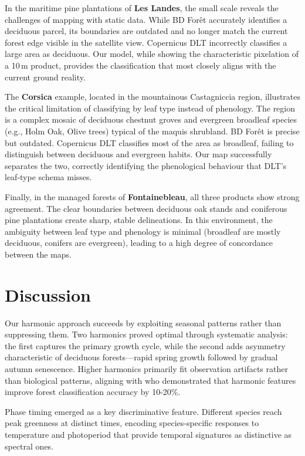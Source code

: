 \documentclass[utf8]{FrontiersinHarvard}
\begin{document}
In the maritime pine plantations of \textbf{Les Landes}, the small scale reveals the challenges of mapping with static data. While BD Forêt accurately identifies a deciduous parcel, its boundaries are outdated and no longer match the current forest edge visible in the satellite view. Copernicus DLT incorrectly classifies a large area as deciduous. Our model, while showing the characteristic pixelation of a 10\,m product, provides the classification that most closely aligns with the current ground reality.

The \textbf{Corsica} example, located in the mountainous Castagniccia region, illustrates the critical limitation of classifying by leaf type instead of phenology. The region is a complex mosaic of deciduous chestnut groves and evergreen broadleaf species (e.g., Holm Oak, Olive trees) typical of the maquis shrubland. BD Forêt is precise but outdated. Copernicus DLT classifies most of the area as broadleaf, failing to distinguish between deciduous and evergreen habits. Our map successfully separates the two, correctly identifying the phenological behaviour that DLT's leaf-type schema misses.

Finally, in the managed forests of \textbf{Fontainebleau}, all three products show strong agreement. The clear boundaries between deciduous oak stands and coniferous pine plantations create sharp, stable delineations. In this environment, the ambiguity between leaf type and phenology is minimal (broadleaf are mostly deciduous, conifers are evergreen), leading to a high degree of concordance between the maps.

\section{Discussion}

Our harmonic approach succeeds by exploiting seasonal patterns rather than suppressing them. Two harmonics proved optimal through systematic analysis: the first captures the primary growth cycle, while the second adds asymmetry characteristic of deciduous forests—rapid spring growth followed by gradual autumn senescence. Higher harmonics primarily fit observation artifacts rather than biological patterns, aligning with \citet{Wilson2018} who demonstrated that harmonic features improve forest classification accuracy by 10-20\%.

Phase timing emerged as a key discriminative feature. Different species reach peak greenness at distinct times, encoding species-specific responses to temperature and photoperiod that provide temporal signatures as distinctive as spectral ones.
\end{document}
